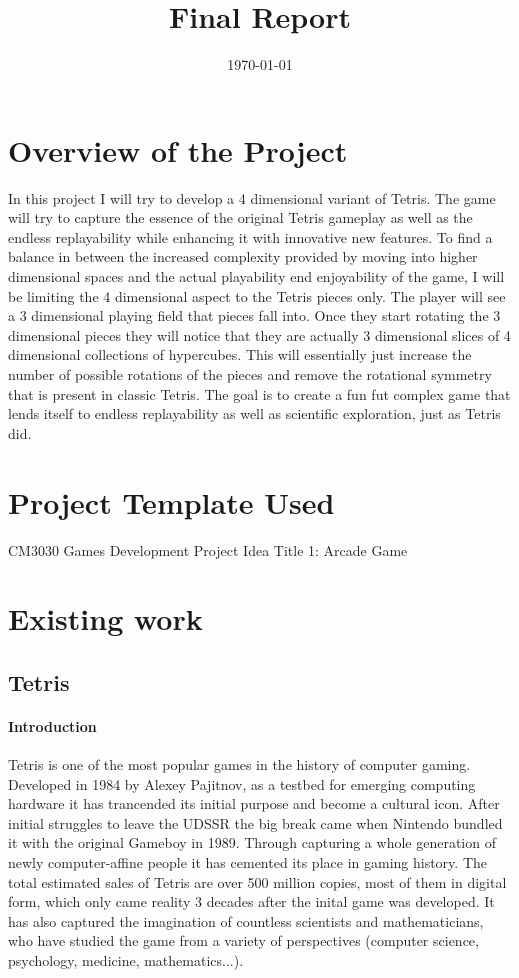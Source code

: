 \documentclass{article}
\title{Final Report}
\date{\today}
\begin{document}
\maketitle
\newpage
\tableofcontents   
\section{Overview of the Project}

In this project I will try to develop a 4 dimensional variant of Tetris. The game will try to capture the essence of the original Tetris gameplay as well as the endless replayability while enhancing it with innovative new features. To find a balance in between the increased complexity provided by moving into higher dimensional spaces and the actual playability end enjoyability of the game, I will be limiting the 4 dimensional aspect to the Tetris pieces only. The player will see a 3 dimensional playing field that pieces fall into. Once they start rotating the 3 dimensional pieces they will notice that they are actually 3 dimensional slices of 4 dimensional collections of hypercubes. This will essentially just increase the number of possible rotations of the pieces and remove the rotational symmetry that is present in classic Tetris.
The goal is to create a fun fut complex game that lends itself to endless replayability as well as scientific exploration, just as Tetris did.

\section{Project Template Used}
CM3030 Games Development Project Idea Title 1: Arcade Game

\section{Existing work}
\subsection{Tetris}
\paragraph{Introduction}
Tetris is one of the most popular games in the history of computer gaming. Developed in 1984 by Alexey Pajitnov, as a testbed for emerging computing hardware it has trancended its initial purpose and become a cultural icon. 
After initial struggles to leave the UDSSR the big break came when Nintendo bundled it with the original Gameboy in 1989. 
Through capturing a whole generation of newly computer-affine people it has cemented its place in gaming history. The total estimated sales of Tetris are over 500 million copies, most of them in digital form, which only came reality 3 decades after the inital game was developed.
It has also captured the imagination of countless scientists and mathematicians, who have studied the game from a variety of perspectives (computer science, psychology, medicine, mathematics...).
\end{document}
